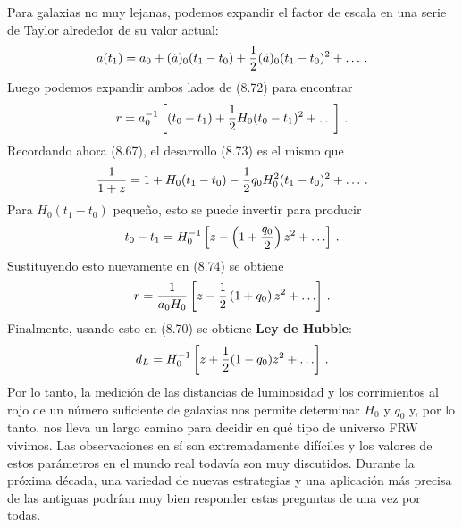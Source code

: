 \documentclass[11pt,b5paper,openany,twoside]{book}
\begin{document}
Para galaxias no muy lejanas, podemos expandir el factor de escala en una serie de Taylor alrededor de su valor actual:
\begin{equation}
a(t_1)=a_0 + (\dot a)_0(t_1-t_0) +{1\over 2}(\ddot a)_0
(t_1-t_0)^2 + \ldots \,.\label{8.73}
\end{equation}
Luego podemos expandir ambos lados de (8.72) para encontrar
\begin{equation}
r= a_0^{-1}\left[(t_0-t_1)+{1\over 2}H_0(t_0-t_1)^2 +\ldots
\right]\,.
\label{8.74}
\end{equation}
Recordando ahora (8.67), el desarrollo (8.73) es el mismo que
\begin{equation}
{1\over {1+z}} = 1+H_0(t_1-t_0) -{1\over 2}q_0 H_0^2
(t_1-t_0)^2 + \ldots \,.\label{8.75}
\end{equation}
Para $H_0(t_1-t_0)$ pequeño, esto se puede invertir para producir
\begin{equation}
t_0-t_1 = H_0^{-1}\left[z-\left(1+{{q_0}\over 2}\right)
z^2 + \ldots\right]\,.\label{8.76}
\end{equation}
Sustituyendo esto nuevamente en (8.74) se obtiene
\begin{equation}
r = {1\over{a_0 H_0}}\left[z-{1\over 2}\left(1+q_0\right)
z^2 + \ldots\right]\,.\label{8.77}
\end{equation}
Finalmente, usando esto en (8.70) se obtiene {\bf Ley de Hubble}:
\begin{equation}
d_L = H_0^{-1}\left[ z+{1\over 2}(1-q_0)z^2 + \ldots\right]\,.
\label{8.78}
\end{equation}
Por lo tanto, la medición de las distancias de luminosidad y los corrimientos al rojo de un número suficiente de galaxias nos permite determinar $H_0$ y $q_0$ y, por lo tanto, nos lleva un largo camino para decidir en qué tipo de universo FRW vivimos.
Las observaciones en sí son extremadamente difíciles y los valores de estos parámetros en el mundo real todavía son muy discutidos.
Durante la próxima década, una variedad de nuevas estrategias y una aplicación más precisa de las antiguas podrían muy bien responder estas preguntas de una vez por todas.
\end{document}
